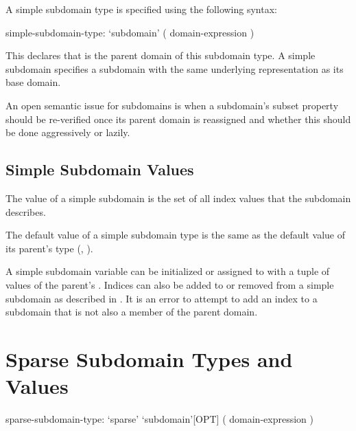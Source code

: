 A simple subdomain type is specified using the following syntax:
\begin{syntax}
simple-subdomain-type:
  `subdomain' ( domain-expression )
\end{syntax}

This declares that  is the parent domain of
this subdomain type.  A simple subdomain specifies a subdomain
with the same underlying representation as its base domain.  

\begin{openissue}

An open semantic issue for subdomains is when a subdomain's subset
property should be re-verified once its parent domain is reassigned
and whether this should be done aggressively or lazily.

\end{openissue}

\subsection{Simple Subdomain Values}

The value of a simple subdomain is the set of all index values
that the subdomain describes.


The default value of a simple subdomain type is the same as the default value
of its parent's type
(, ).

A simple subdomain variable can be initialized or assigned to
with a tuple of values of the parent's .
Indices can also be added to or removed from a simple subdomain
as described in .
It is an error to attempt to add an index to a subdomain that is not also
a member of the parent domain.


\section{Sparse Subdomain Types and Values}
\label{Sparse_Subdomain_Types_and_Values}

\begin{syntax}
sparse-subdomain-type:
  `sparse' `subdomain'[OPT] ( domain-expression )
\end{syntax}

